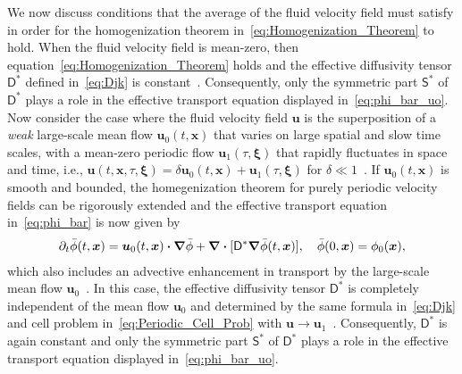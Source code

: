 \documentclass[leqno,onefignum,onetabnum]{siamltex1213}
\newcommand{\Dm}{\mathsf{D}}
\newcommand{\Sm}{\mathsf{S}}
\newcommand\bnabla{\mbox{\boldmath${\nabla}$}}
\providecommand\bcdot{\boldsymbol{\cdot}}
\newcommand{\vecx}{\boldsymbol{x}}
\newcommand{\vecu}{\boldsymbol{u}}
\newcommand{\vecxi}{\boldsymbol{\xi}}
\begin{document}
We now discuss conditions that the average of the fluid velocity field
must satisfy in order for the homogenization theorem
in~\eqref{eq:Homogenization_Theorem} to hold. When the fluid velocity
field is mean-zero, then equation~\eqref{eq:Homogenization_Theorem}
holds and the effective diffusivity tensor $\Dm^*$ defined
in~\eqref{eq:Djk} is
constant~\cite{Majda:Kramer:1999:book}. Consequently, only the
symmetric part $\Sm^*$ of $\Dm^*$ plays a role in the effective
transport equation displayed in~\eqref{eq:phi_bar_uo}. Now consider
the case where the fluid velocity field $\vecu$ is the superposition
of a \emph{weak} large-scale mean flow $\vecu_0(t,\vecx)$ that varies
on large spatial and slow time scales, with a mean-zero periodic flow
$\vecu_1(\tau,\vecxi)$ that rapidly fluctuates in space and time, i.e.,
$\vecu(t,\vecx,\tau,\vecxi)=\delta\vecu_0(t,\vecx)+\vecu_1(\tau,\vecxi)$ for
$\delta\ll1$~\cite{Majda:Kramer:1999:book}. If 
$\vecu_0(t,\vecx)$ is smooth and bounded, the homegenization theorem
for purely periodic velocity fields can be rigorously extended and the
effective transport equation in~\eqref{eq:phi_bar} is now given
by~\cite{Majda:Kramer:1999:book}  
%
\begin{align}\label{eq:phi_bar_uo}
  \partial_t\bar{\phi}(t,\vecx)=\vecu_0(t,\vecx)\bcdot\bnabla\bar{\phi}
                   +\bnabla\bcdot[\Dm^*\bnabla\bar{\phi}(t,\vecx)],
  \quad 
  \bar{\phi}(0,\vecx)=\phi_0(\vecx),
\end{align}
%
which also includes an advective enhancement in transport by the
large-scale mean flow $\vecu_0$~\cite{Majda:Kramer:1999:book}. In this
case, the effective diffusivity tensor $\Dm^*$ is completely
independent of the mean flow $\vecu_0$ and determined by the same
formula in~\eqref{eq:Djk} and cell problem
in~\eqref{eq:Periodic_Cell_Prob} with
$\vecu\to\vecu_1$~\cite{Majda:Kramer:1999:book}. Consequently, $\Dm^*$
is again constant and only the symmetric part $\Sm^*$ of $\Dm^*$ plays
a role in the effective transport equation displayed
in~\eqref{eq:phi_bar_uo}. 
\end{document}
